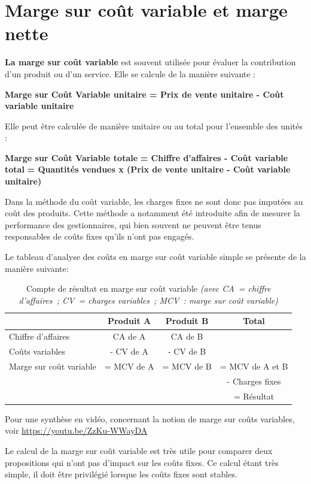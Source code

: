 \documentclass[oneside]{kaobook}
\begin{document}
\section{Marge sur coût variable et marge nette}
\label{sec:org9d8ece3}
\textbf{La marge sur coût variable} est souvent utilisée pour évaluer la contribution d'un produit ou d'un service. Elle se calcule de la manière suivante : 
\begin{center}
\textbf{Marge sur Coût Variable unitaire = Prix de vente unitaire - Coût variable unitaire}
\end{center}
Elle peut être calculée de manière unitaire ou au total pour l'ensemble des unités :
\begin{center}
\textbf{Marge sur Coût Variable totale}
\textbf{= Chiffre d'affaires - Coût variable total}
\textbf{= Quantités vendues x (Prix de vente unitaire - Coût variable unitaire)}
\end{center}
Dans la méthode du coût variable, les charges fixes ne sont donc pas imputées au coût des produits. Cette méthode a notamment été introduite afin de mesurer la performance des gestionnaires, qui bien souvent ne peuvent être tenus responsables de coûts fixes qu'ils n'ont pas engagés.

Le tableau d'analyse des coûts en marge sur coût variable simple se présente de la manière suivante:
\begin{table}[htbp]
\caption{Compte de résultat en marge sur coût variable \emph{(avec CA = chiffre d'affaires ; CV = charges variables ; MCV : marge sur coût variable)}}
\footnotesize
\begin{tabular}{l c c c}
 & Produit A & Produit B & Total\\
\hline
Chiffre d'affaires & CA de A & CA de B & \\
Coûts variables & - CV de A & - CV de B & \\
Marge sur coût variable & = MCV de A & = MCV de B & = MCV de A et B\\
 &  &  & - Charges fixes\\
 &  &  & = Résultat\\
\end{tabular}
\end{table}

\begin{kaobox}
Pour une synthèse en vidéo, concernant la notion de marge sur coûts variables, voir \url{https://youtu.be/ZzKu-WWayDA}
\end{kaobox}

Le calcul de la marge sur coût variable est très utile pour comparer deux propositions qui n'ont pas d'impact sur les coûts fixes. Ce calcul étant très simple, il doit être privilégié lorsque les coûts fixes sont stables. 
\end{document}
